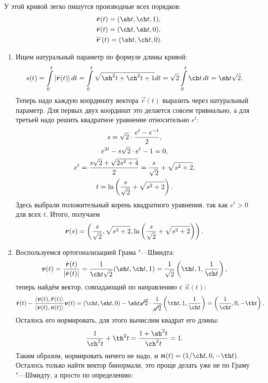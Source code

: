 \begin{solution}
	У этой кривой легко пишутся производные всех порядков:
	\begin{gather*}
		\dot{\vec{r}}(t) = (\sh t, \ch t, 1),\\
		\ddot{\vec{r}}(t) = (\ch t, \sh t, 0),\\
		\dddot{\vec{r}}(t) = (\sh t, \ch t, 0).
	\end{gather*}
	\begin{enumerate}[nolistsep, label=(\arabic*)]
		\item Ищем натуральный параметр по формуле длины кривой:
			\[
				s(t) = \int\limits_0^t\abs{\dot{\vec{r}}(t)}dt = \int\limits_0^t\sqrt{\sh^2t + \ch^2t + 1}dt = \sqrt{2}\int\limits_0^t\ch t\,dt = \sh t\sqrt{2}.
			\]
			Теперь надо каждую координату вектора $\vec{r}(t)$ выразить через натуральный параметр. Для первых двух координат это делается совсем тривиально, а для третьей надо решить квадратное уравнение относительно $e^t$:
			\begin{gather*}
				s = \sqrt{2} \cdot \frac{e^t - e^{-t}}{2},\\
				e^{2t} - s\sqrt{2} \cdot e^t - 1 = 0,\\
				e^t = \frac{s\sqrt{2} + \sqrt{2s^2 + 4}}{2} = \frac{s}{\sqrt{2}} + \sqrt{s^2 + 2},\\
				t = \ln\left(\frac{s}{\sqrt{2}} + \sqrt{s^2 + 2}\right).
			\end{gather*}
			Здесь выбрали положительный корень квадратного уравнения, так как $e^t > 0$ для всех $t$. Итого, получаем
			\[
				\boldsymbol{r}(s) = \left(\frac{s}{\sqrt{2}}, \sqrt{s^2 + 2}, \ln\left(\frac{s}{\sqrt{2}} + \sqrt{s^2 + 2}\right)\right).
			\]
		\item Воспользуемся ортогонализацией Грама "---Шмидта:
			\[
				\vec{v}(t) = \frac{\dot{\vec{r}}(t)}{\abs{\dot{\vec{r}}(t)}} = \frac{1}{\ch t \sqrt{2}}(\sh t, \ch t, 1) = \frac{1}{\sqrt{2}}\br{\th t, 1, \frac{1}{\ch t}},
			\]
			теперь найдём вектор, совпадающий по направлению с $\vec{n}(t)$:
			\[
				\ddot{\vec{r}}(t) - \frac{\langle \vec{v}(t), \ddot{\vec{r}}(t) \rangle}{\langle \vec{v}(t), \vec{v}(t)\rangle}\vec{v}(t) = (\ch t, \sh t, 0) - \sh t \cancel{\sqrt{2}} \cdot \frac{1}{\cancel{\sqrt{2}}}\br{\th t, 1, \frac{1}{\ch t}} = \br{\frac{1}{\ch t}, 0, -\th t}.
			\]
			Осталось его нормировать, для этого вычислим квадрат его длины:
			\[
				\frac{1}{\ch^2t} + \th^2t = \frac{1 + \sh^2t}{\ch^2t} = 1.
			\]
			Таким образом, нормировать ничего не надо, и $\vec{n}(t) = (1 / \ch t, 0, -\th t)$. Осталось только найти вектор бинормали, это проще делать уже не по Граму "---Шмидту, а просто по определению:

\end{enumerate}
\end{solution}
